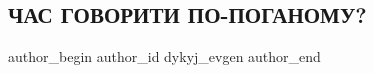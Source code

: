  
 
 
 
 

\subsection{ЧАС ГОВОРИТИ ПО-ПОГАНОМУ?}
\label{sec:01_07_2023.fb.dykyj_evgen.1.chas_govoryty_po_poganomu}

\ifcmt
 author_begin
   author_id dykyj_evgen
 author_end
\fi
